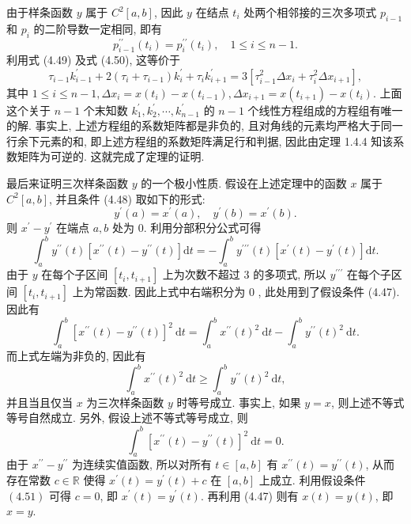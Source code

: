 \documentclass[openany]{ctexbook}
\makeatletter
\theoremstyle{kaiti}
\theoremstyle{normal}
\renewenvironment{proof}[1][\proofname]{\par
    \pushQED{\qed}%
    \normalfont \topsep6\p@\@plus6\p@\relax
    \trivlist
    \item\relax
    {\heiti #1}\hspace{2\labelsep}\ignorespaces
  }{%
    \popQED\endtrivlist\@endpefalse
  }
\makeatother
\begin{document}
\begin{proof}
由于样条函数 $y$ 属于 $C^2[a, b]$, 因此 $y$ 在结点 $t_{i}$ 处两个相邻接的三次多项式 $p_{i-1}$ 和 $p_{i}$ 的二阶导数一定相同, 即有
$$
p_{i-1}^{\prime \prime}\left(t_{i}\right)=p_{i}^{\prime \prime}\left(t_{i}\right), \quad 1 \leqslant i \leqslant n-1.
$$
利用式 (4.49) 及式 (4.50), 这等价于
$$
\tau_{i-1} k_{i-1}^{\prime}+2\left(\tau_{i}+\tau_{i-1}\right) k_{i}^{\prime}+\tau_{i} k_{i+1}^{\prime}=3\left[\tau_{i-1}^2 \Delta x_{i}+\tau_{i}^2 \Delta x_{i+1}\right],
$$
其中 $1 \leqslant i \leqslant n-1, \Delta x_{i}=x\left(t_{i}\right)-x\left(t_{i-1}\right), \Delta x_{i+1}=x\left(t_{i+1}\right)-x\left(t_{i}\right)$. 上面这个关于 $n-1$ 个末知数 $k_1^{\prime}, k_2^{\prime}, \cdots, k_{n-1}^{\prime}$ 的 $n-1$ 个线性方程组成的方程组有唯一的解. 事实上, 上述方程组的系数矩阵都是非负的, 且对角线的元素均严格大于同一行余下元素的和, 即上述方程组的系数矩阵满足行和判据, 因此由定理 1.4.4 知该系数矩阵为可逆的. 这就完成了定理的证明.
\end{proof}

最后来证明三次样条函数 $y$ 的一个极小性质. 假设在上述定理中的函数 $x$ 属于 $C^2[a, b]$, 并且条件 (4.48) 取如下的形式:
\begin{equation}
  y^{\prime}(a)=x^{\prime}(a), \quad y^{\prime}(b)=x^{\prime}(b).
\end{equation}
则 $x^{\prime}-y^{\prime}$ 在端点 $a, b$ 处为 0. 利用分部积分公式可得
$$
\int_{a}^{b} y^{\prime \prime}(t)\left[x^{\prime \prime}(t)-y^{\prime \prime}(t)\right] \mathrm{d} t=-\int_{a}^{b} y^{\prime \prime \prime}(t)\left[x^{\prime}(t)-y^{\prime}(t)\right] \mathrm{d} t.
$$
由于 $y$ 在每个子区间 $\left[t_{i}, t_{i+1}\right]$ 上为次数不超过 3 的多项式, 所以 $y^{\prime \prime \prime}$ 在每个子区间 $\left[t_{i}, t_{i+1}\right]$ 上为常函数. 因此上式中右端积分为 0 , 此处用到了假设条件 (4.47). 因此有
$$
\int_{a}^{b}\left[x^{\prime \prime}(t)-y^{\prime \prime}(t)\right]^2 \mathrm{~d} t=\int_{a}^{b} x^{\prime \prime}(t)^2 \mathrm{~d} t-\int_{a}^{b} y^{\prime \prime}(t)^2 \mathrm{~d} t.
$$
而上式左端为非负的, 因此有
$$
\int_{a}^{b} x^{\prime \prime}(t)^2 \mathrm{~d} t \geqslant \int_{a}^{b} y^{\prime \prime}(t)^2 \mathrm{~d} t,
$$
并且当且仅当 $x$ 为三次样条函数 $y$ 时等号成立. 事实上, 如果 $y=x$, 则上述不等式等号自然成立. 另外, 假设上述不等式等号成立, 则
$$
\int_{a}^{b}\left[x^{\prime \prime}(t)-y^{\prime \prime}(t)\right]^2 \mathrm{~d} t=0.
$$
由于 $x^{\prime \prime}-y^{\prime \prime}$ 为连续实值函数, 所以对所有 $t \in[a, b]$ 有 $x^{\prime \prime}(t)=y^{\prime \prime}(t)$, 从而存在常数 $c \in \mathbb{R}$ 使得 $x^{\prime}(t)=y^{\prime}(t)+c$ 在 $[a, b]$ 上成立. 利用假设条件 $(4.51)$ 可得 $c=0$, 即 $x^{\prime}(t)=y^{\prime}(t)$. 再利用 (4.47) 则有 $x(t)=y(t)$, 即 $x=y$.
\end{document}
